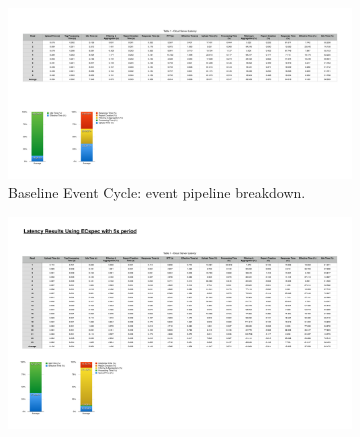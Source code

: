 \begin{figure}[ht!]
  \centering
  \begin{subfigure}{.5\textwidth}
    \centering
    \includegraphics[height=\linewidth]{./images/cloud_ecspec_effective_breakdown}
    \caption{Baseline Event Cycle: event pipeline breakdown.}
    \label{fig:ecspecf_effective_base}
  \end{subfigure}%
  \begin{subfigure}{.5\textwidth}
    \centering
    \includegraphics[height=\linewidth]{./images/cloud_ecspecf_effective_breakdown}

\end{subfigure}
\end{figure}

